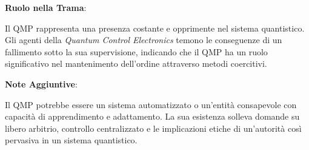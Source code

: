 \begin{tcolorbox}[fontupper=\footnotesize, fontlower=\Large,colback=white,colframe=black,title=\textbf{Quantum Master (o Control) Program (QMP)}]
\begin{multicols}{2}
\textbf{Ruolo nella Trama}:

Il QMP rappresenta una presenza costante e opprimente nel sistema quantistico. Gli agenti della \emph{Quantum Control Electronics} temono le conseguenze di un fallimento sotto la sua supervisione, indicando che il QMP ha un ruolo significativo nel mantenimento dell'ordine attraverso metodi coercitivi.

\textbf{Note Aggiuntive}:

Il QMP potrebbe essere un sistema automatizzato o un'entità consapevole con capacità di apprendimento e adattamento. La sua esistenza solleva domande su libero arbitrio, controllo centralizzato e le implicazioni etiche di un'autorità così pervasiva in un sistema quantistico.

\end{multicols}
\end{tcolorbox}


